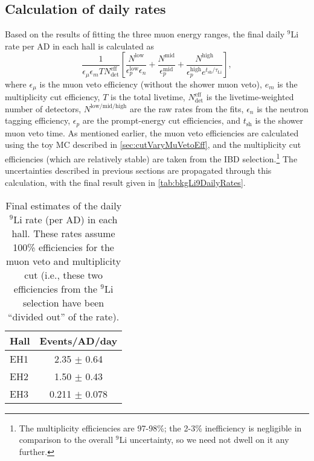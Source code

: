\documentclass[../thesis.tex]{subfiles}
\begin{document}
\subsection{Calculation of daily rates}
\label{sec:bkgLi9DailyRateCalc}

Based on the results of fitting the three muon energy ranges, the final daily $^9$Li rate per AD in each hall is calculated as
\begin{equation}
  \label{eq:bkgLi9DailyRate}
  \frac{1}{\epsilon_\mu \epsilon_m T N^{\mathrm{eff}}_{\mathrm{det}}}
  \left[ \frac{N^{\mathrm{low}}}{\epsilon^{\mathrm{low}}_p \epsilon_n} 
    + \frac{N^{\mathrm{mid}}}{\epsilon_p^{\mathrm{mid}}}
    + \frac{N^{\mathrm{high}}}{\epsilon_p^{\mathrm{high}} e^{t_{\mathrm{sh}} / \tau_{\mathrm{Li}}}}
  \right],
\end{equation}
where $\epsilon_\mu$ is the muon veto efficiency (without the shower muon veto), $e_m$ is the multiplicity cut efficiency, $T$ is the total livetime, $N^{\mathrm{eff}}_{\mathrm{det}}$ is the livetime-weighted number of detectors, $N^{\mathrm{low/mid/high}}$ are the raw rates from the fits, $\epsilon_n$ is the neutron tagging efficiency, $\epsilon_p$ are the prompt-energy cut efficiencies, and $t_{\mathrm{sh}}$ is the shower muon veto time. As mentioned earlier, the muon veto efficiencies are calculated using the toy MC described in \autoref{sec:cutVaryMuVetoEff}, and the multiplicity cut efficiencies (which are relatively stable) are taken from the IBD selection.\footnote{The multiplicity efficiencies are 97-98\%; the 2-3\% inefficiency is negligible in comparison to the overall $^9$Li uncertainty, so we need not dwell on it any further.} The uncertainties described in previous sections are propagated through this calculation, with the final result given in \autoref{tab:bkgLi9DailyRates}.

\begin{table}[h]
  \begin{tabular}{lc}
    \toprule
    Hall & Events/AD/day \\
    \midrule
    EH1 & 2.35 $\pm$ 0.64 \\
    EH2 & 1.50 $\pm$ 0.43 \\
    EH3 & 0.211 $\pm$ 0.078 \\
    \bottomrule
  \end{tabular}
  \caption{Final estimates of the daily $^9$Li rate (per AD) in each hall. These rates assume 100\% efficiencies for the muon veto and multiplicity cut (i.e., these two efficiencies from the $^9$Li selection have been ``divided out'' of the rate).}
  \label{tab:bkgLi9DailyRates}
\end{table}
\end{document}
